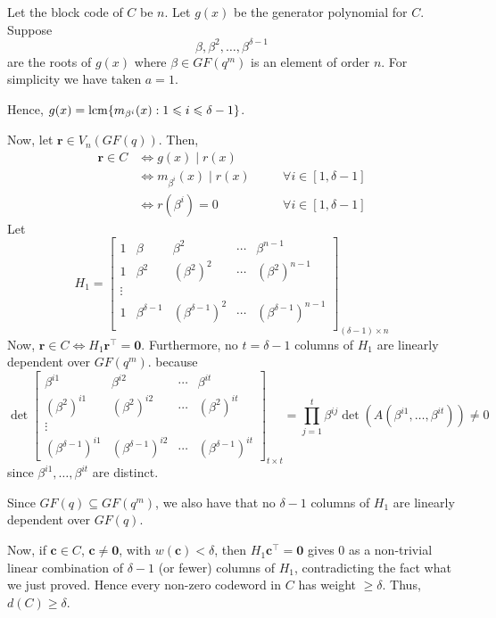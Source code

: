 \begin{Proof}{}{}
    Let the block code of $ C $ be $ n $. Let $ g(x) $ be
    the generator polynomial for $ C $. Suppose
    \[ \beta,\beta^2,\ldots ,\beta^{\delta-1} \]
    are the roots of $ g(x) $ where $ \beta\in GF(q^m) $
    is an element of order $ n $. For simplicity we have taken
    $ a=1 $.

    Hence, $ g(x)=\operatorname{lcm} \{m_{\beta^i}(x):1\leqslant i\leqslant \delta-1\} $.

    Now, let $ \symbf{r}\in V_n(GF(q)) $. Then,
    \[ \begin{aligned}
            \symbf{r}\in C
             & \iff g(x)\mid r(x)                                              \\
             & \iff m_{\beta^i}(x)\mid r(x) & \quad & \forall i\in[1,\delta-1] \\
             & \iff r(\beta^i)=0            & \quad & \forall i\in[1,\delta-1]
        \end{aligned} \]
    Let
    \[ H_1=
        \begin{bmatrix}
            1 & \beta            & \beta^2              & \cdots & \beta^{n-1}              \\
            1 & \beta^2          & (\beta^2)^2          & \cdots & (\beta^2)^{n-1}          \\
            \vdots                                                                          \\
            1 & \beta^{\delta-1} & (\beta^{\delta-1})^2 & \cdots & (\beta^{\delta-1})^{n-1} \\
        \end{bmatrix}_{(\delta-1)\times n} \]
    Now, $ \symbf{r}\in C\iff H_1\symbf{r}^\top=\symbf{0} $. Furthermore, no $ t=\delta-1 $
    columns of $ H_1 $ are linearly dependent over $ GF(q^m) $.
    because
    \[ \det
        \begin{bmatrix}
            \beta^{i1}              & \beta^{i2}              & \cdots & \beta^{it}              \\
            (\beta^2)^{i1}          & (\beta^2)^{i2}          & \cdots & (\beta^2)^{it}          \\
            \vdots                                                                               \\
            (\beta^{\delta-1})^{i1} & (\beta^{\delta-1})^{i2} & \cdots & (\beta^{\delta-1})^{it}
        \end{bmatrix}_{t\times t}=\prod_{j=1}^t\beta^{ij}\det(A(\beta^{i1},\ldots,\beta^{it}))\neq 0 \]
    since $ \beta^{i1},\ldots ,\beta^{it} $ are distinct.

    Since $ GF(q)\subseteq GF(q^m) $, we also have that no $ \delta-1 $ columns
    of $ H_1 $ are linearly dependent over $ GF(q) $.

    Now, if $ \symbf{c}\in C $, $ \symbf{c}\neq \symbf{0} $, with $ w(\symbf{c})<\delta $,
    then $ H_1\symbf{c}^\top=\symbf{0} $ gives $ 0 $ as a non-trivial
    linear combination of $ \delta-1 $ (or fewer) columns of $ H_1 $,
    contradicting the fact what we just proved. Hence every
    non-zero codeword in $ C $ has weight $ \geqslant \delta $.
    Thus, $ d(C)\geqslant \delta $.
\end{Proof}
